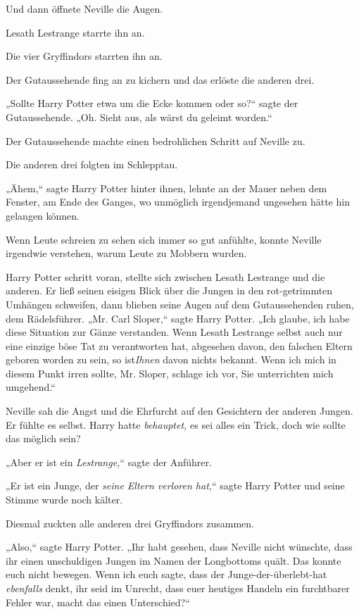 {Und dann öffnete Neville die Augen.

Lesath Lestrange starrte ihn an.

Die vier Gryffindors starrten ihn an.

Der Gutaussehende fing an zu kichern und das erlöste die anderen drei.

„Sollte Harry Potter etwa um die Ecke kommen oder so?“ sagte der Gutaussehende. „Oh. Sieht aus, als wärst du geleimt worden.“

Der Gutaussehende machte einen bedrohlichen Schritt auf Neville zu.

Die anderen drei folgten im Schlepptau.

„Ähem,“ sagte Harry Potter hinter ihnen, lehnte an der Mauer neben dem Fenster, am Ende des Ganges, wo unmöglich irgendjemand ungesehen hätte hin gelangen können.

Wenn Leute schreien zu sehen sich immer so gut anfühlte, konnte Neville irgendwie verstehen, warum Leute zu Mobbern wurden.

Harry Potter schritt voran, stellte sich zwischen Lesath Lestrange und die anderen. Er ließ seinen eisigen Blick über die Jungen in den rot-getrimmten Umhängen schweifen, dann blieben seine Augen auf dem Gutaussehenden ruhen, dem Rädelsführer. „Mr. Carl Sloper,“ sagte Harry Potter. „Ich glaube, ich habe diese Situation zur Gänze verstanden. Wenn Lesath Lestrange selbst auch nur eine einzige böse Tat zu verantworten hat, abgesehen davon, den falschen Eltern geboren worden zu sein, so ist\emph{Ihnen} davon nichts bekannt. Wenn ich mich in diesem Punkt irren sollte, Mr. Sloper, schlage ich vor, Sie unterrichten mich umgehend.“

Neville sah die Angst und die Ehrfurcht auf den Gesichtern der anderen Jungen. Er fühlte es selbst. Harry hatte \emph{behauptet,} es sei alles ein Trick, doch wie sollte das möglich sein?

„Aber er ist ein \emph{Lestrange,}“ sagte der Anführer.

„Er ist ein Junge, der \emph{seine Eltern verloren hat,}“ sagte Harry Potter und seine Stimme wurde noch kälter.

Diesmal zuckten alle anderen drei Gryffindors zusammen.

„Also,“ sagte Harry Potter. „Ihr habt gesehen, dass Neville nicht wünschte, dass ihr einen unschuldigen Jungen im Namen der Longbottoms quält. Das konnte euch nicht bewegen. Wenn ich euch sagte, dass der Junge-der-überlebt-hat \emph{ebenfalls} denkt, ihr seid im Unrecht, dass euer heutiges Handeln ein furchtbarer Fehler war, macht das einen Unterschied?“

}

